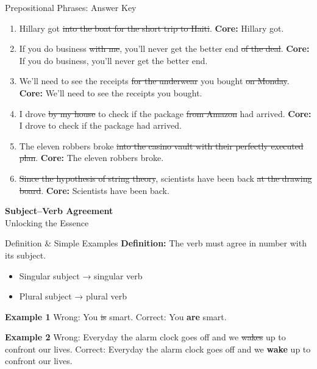 \documentclass[aspectratio=169,11pt]{beamer}
\begin{document}
\begin{frame}{Prepositional Phrases: Answer Key}
\small
\begin{enumerate}
  \item Hillary got \sout{into the boat for the short trip to Haiti}.  
        \textbf{Core:} Hillary got.

  \item If you do business \sout{with me}, you’ll never get the better end \sout{of the deal}.  
        \textbf{Core:} If you do business, you’ll never get the better end.

  \item We’ll need to see the receipts \sout{for the underwear} you bought \sout{on Monday}.  
        \textbf{Core:} We’ll need to see the receipts you bought.

  \item I drove \sout{by my house} to check if the package \sout{from Amazon} had arrived.  
        \textbf{Core:} I drove to check if the package had arrived.

  \item The eleven robbers broke \sout{into the casino vault with their perfectly executed plan}.  
        \textbf{Core:} The eleven robbers broke.

  \item \sout{Since the hypothesis of string theory}, scientists have been back \sout{at the drawing board}.  
        \textbf{Core:} Scientists have been back.
\end{enumerate}
\end{frame}

\begin{frame}
  \centering
  \Huge \textbf{Subject–Verb Agreement} \\[1.5em]
  \Large Unlocking the Essence
\end{frame}

\begin{frame}{Definition \& Simple Examples}
\small
\textbf{Definition:} The verb must agree in number with its subject.  
\begin{itemize}
  \item Singular subject → singular verb  
  \item Plural subject → plural verb
\end{itemize}

\vspace{0.5em}
\textbf{Example 1}  
Wrong: You \sout{is} smart.  
Correct: You \textbf{are} smart.

\vspace{0.5em}
\textbf{Example 2}  
Wrong: Everyday the alarm clock goes off and we \sout{wakes} up to confront our lives.  
Correct: Everyday the alarm clock goes off and we \textbf{wake} up to confront our lives.
\end{frame}
\end{document}
